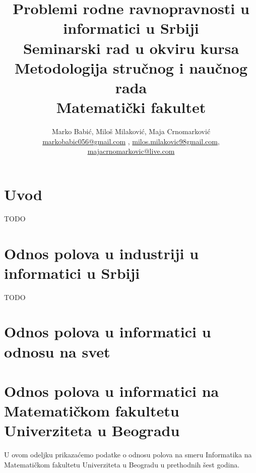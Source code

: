 \documentclass[a4paper]{article}
\begin{document}
\title{Problemi rodne ravnopravnosti u informatici u Srbiji\\
\vspace{5mm}
\small{Seminarski rad u okviru kursa\\Metodologija stručnog i naučnog rada\\ Matematički fakultet}}

\author{Marko Babić, Miloš Milaković,  Maja Crnomarković\\ \href{mailto:markobabic056@gmail.com}{markobabic056@gmail.com} , \href{mailto:milos.milakovic98@gmail.com}{milos.milakovic98gmail.com}, \href{mailto:majacrnomarkovic@live.com}{majacrnomarkovic@live.com}}

\maketitle


\tableofcontents

\newpage

\section{Uvod}
\label{sec:uvod}

TODO

\section{Odnos polova u industriji u informatici u Srbiji}
TODO



\section{Odnos polova u informatici u odnosu na svet}	




\section{Odnos polova u informatici na Matematičkom fakultetu Univerziteta u Beogradu}
\label{matematicki}
U ovom odeljku prikazaćemo podatke o odnosu polova na smeru Informatika na Matematičkom fakultetu Univerziteta u Beogradu u prethodnih šest godina. \\
\end{document}
